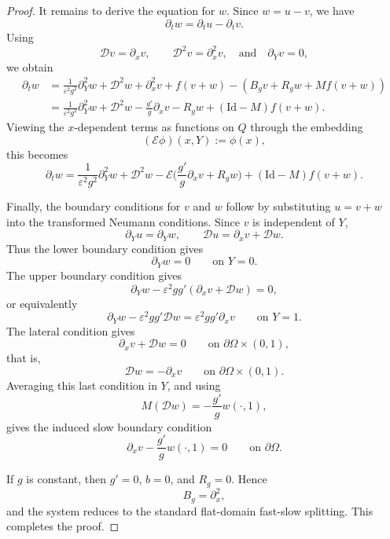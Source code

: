 \documentclass[10pt,a4paper]{amsart}
\newcommand{\Id}{\mathrm{Id}}
\begin{document}
\begin{proof}
It remains to derive the equation for \(w\). Since \(w=u-v\), we have
\[
\partial_tw=\partial_tu-\partial_tv.
\]
Using
\[
\mathcal Dv=\partial_xv,
\qquad
\mathcal D^2v=\partial_x^2v,
\quad \text{and}\quad 
\partial_Yv=0,
\]
we obtain
\[
\begin{aligned}
\partial_tw
&=
\frac1{\varepsilon^2g^2}\partial_Y^2w
+
\mathcal D^2w
+
\partial_x^2v
+
f(v+w)
-
\left(
 B_gv+R_gw+Mf(v+w)
\right)
\\
&=
\frac1{\varepsilon^2g^2}\partial_Y^2w
+
\mathcal D^2w
-
\frac{g'}g\partial_xv
-
R_gw
+
(\Id-M)f(v+w).
\end{aligned}
\]
Viewing the \(x\)-dependent terms as functions on \(Q\) through the embedding
\[
(\mathcal E\phi)(x,Y):=\phi(x),
\]
this becomes
\[
\partial_tw
=
\frac1{\varepsilon^2g^2}\partial_Y^2w
+
\mathcal D^2w
-
\mathcal E\bigl(\frac{g'}g\partial_xv+R_gw\bigr)
+
(\Id-M)f(v+w).
\]

Finally, the boundary conditions for \(v\) and \(w\) follow by substituting \(u=v+w\) into the
transformed Neumann conditions. Since \(v\) is independent of \(Y\),
\[
\partial_Yu=\partial_Yw,
\qquad
\mathcal Du=\partial_xv+\mathcal Dw.
\]
Thus the lower boundary condition gives
\[
\partial_Yw=0
\qquad\text{on }Y=0.
\]
The upper boundary condition gives
\[
\partial_Yw-\varepsilon^2gg'(\partial_xv+\mathcal Dw)=0,
\]
or equivalently
\[
\partial_Yw-\varepsilon^2gg'\mathcal Dw
=
\varepsilon^2gg'\partial_xv
\qquad\text{on }Y=1.
\]
The lateral condition gives
\[
\partial_xv+\mathcal Dw=0
\qquad\text{on }\partial\Omega\times(0,1),
\]
that is,
\[
\mathcal Dw=-\partial_xv
\qquad\text{on }\partial\Omega\times(0,1).
\]
Averaging this last condition in \(Y\), and using
\[
M(\mathcal Dw)
=
-\frac{g'}gw(\cdot,1),
\]
gives the induced slow boundary condition
\[
\partial_xv- \frac{g'}gw(\cdot,1)=0
\qquad\text{on }\partial\Omega.
\]

If \(g\) is constant, then \(g'=0\), \(b=0\), and \(R_g=0\). Hence
\[
 B_g=\partial_x^2,
\]
and the system reduces to the standard flat-domain fast-slow splitting. This completes the proof.
\end{proof}
\end{document}
